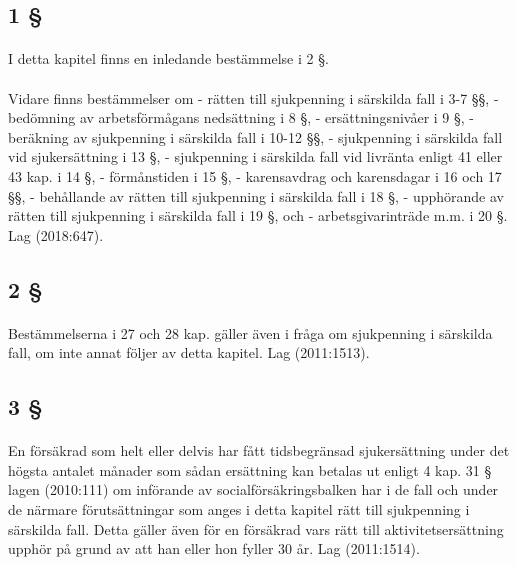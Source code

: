 \documentclass[a4paper,notitlepage,openany,10pt]{book}
\begin{document}
\subsection*{1 §}
\paragraph*{}
I detta kapitel finns en inledande bestämmelse i 2 §.
\paragraph*{}
Vidare finns bestämmelser om
\newline - rätten till sjukpenning i särskilda fall i 3-7 §§,
\newline - bedömning av arbetsförmågans nedsättning i 8 §,
\newline - ersättningsnivåer i 9 §,
\newline - beräkning av sjukpenning i särskilda fall i 10-12 §§,
\newline - sjukpenning i särskilda fall vid sjukersättning i 13 §,
\newline - sjukpenning i särskilda fall vid livränta enligt 41 eller 43 kap. i 14 §,
\newline - förmånstiden i 15 §,
\newline - karensavdrag och karensdagar i 16 och 17 §§,
\newline - behållande av rätten till sjukpenning i särskilda fall i 18 §,
\newline - upphörande av rätten till sjukpenning i särskilda fall i 19 §, och
\newline - arbetsgivarinträde m.m. i 20 §.
Lag (2018:647).
\subsection*{2 §}
\paragraph*{}
Bestämmelserna i 27 och 28 kap. gäller även i fråga om sjukpenning i särskilda fall, om inte annat följer av detta kapitel.
Lag (2011:1513).
\subsection*{3 §}
\paragraph*{}
En försäkrad som helt eller delvis har fått tidsbegränsad sjukersättning under det högsta antalet månader som sådan ersättning kan betalas ut enligt 4 kap. 31 § lagen (2010:111) om införande av socialförsäkringsbalken har i de fall och under de närmare förutsättningar som anges i detta kapitel rätt till sjukpenning i särskilda fall. Detta gäller även för en försäkrad vars rätt till aktivitetsersättning upphör på grund av att han eller hon fyller 30 år.
Lag (2011:1514).
\end{document}
